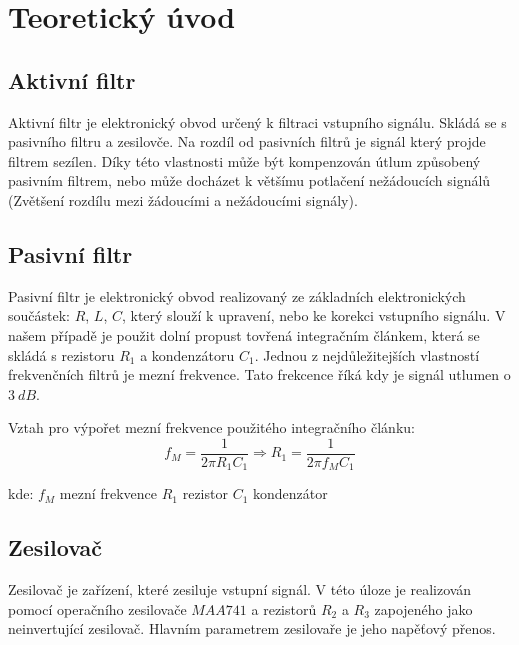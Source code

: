 \section*{Teoretický úvod}
		\subsection*{Aktivní filtr}
			\indent\indent
			Aktivní filtr je elektronický obvod určený k filtraci vstupního signálu. Skládá se s pasivního filtru a zesilovče. Na rozdíl od pasivních filtrů je signál který projde filtrem sezílen. Díky této vlastnosti může být kompenzován útlum způsobený pasivním filtrem, nebo může docházet k většímu potlačení nežádoucích signálů (Zvětšení rozdílu mezi žádoucími a nežádoucími signály).
			
		\subsection*{Pasivní filtr}
			\indent\indent
			Pasivní filtr je elektronický obvod realizovaný ze základních elektronických součástek: $R$, $L$, $C$, který slouží k upravení, nebo ke korekci vstupního signálu. V našem případě je použit dolní propust tovřená integračním článkem, která se skládá s rezistoru $R_1$ a kondenzátoru $C_1$. Jednou z nejdůležitejších vlastností frekvenčních filtrů je mezní frekvence. Tato frekcence říká kdy je signál utlumen o $3~dB$.
			
			
			Vztah pro výpořet mezní frekvence použitého integračního článku:
			\begin{equation}
  				f_M = \dfrac{1}{2\pi R_1 C_1} \Rightarrow R_1 = \dfrac{1}{2\pi f_M C_1}
  			\end{equation}		
		
			\hspace*{2cm}kde:\newline    
  			\hspace*{4cm}$f_M$ \dotfill mezní frekvence\hspace*{4cm}\newline
	  		\hspace*{4cm}$R_1$ \dotfill rezistor\hspace*{4cm}\newline
	  		\hspace*{4cm}$C_1$ \dotfill kondenzátor\hspace*{4cm}\newline
  				
		
			
			
		\subsection*{Zesilovač}
			\indent\indent
			Zesilovač je zařízení, které zesiluje vstupní signál. V této úloze je realizován pomocí operačního zesilovače $MAA741$ a rezistorů $R_2$  a $R_3$ zapojeného jako neinvertující zesilovač. Hlavním parametrem zesilovaře je jeho napěťový přenos.
			
